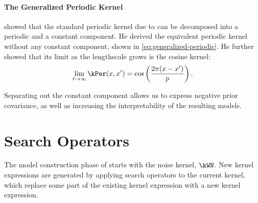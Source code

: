 \subsubsection{The Generalized Periodic Kernel}

\citet{lloyd-periodic} showed that the standard periodic kernel due to \citet{mackay1998introduction} can be decomposed into a periodic and a constant component.
He derived the equivalent periodic kernel without any constant component, shown in \cref{eq:generalized-periodic}.
He further showed that its limit as the lengthscale grows is the cosine kernel:
\begin{equation}
\lim_{\ell \to \infty} \kPer(x, x') = \cos\left(\frac{2 \pi (x - x')}{p}\right).
\end{equation}

Separating out the constant component allows us to express negative prior covariance, as well as increasing the interpretability of the resulting models.






\chapter{Search Operators}
\label{ch:appendix-search}
\label{sec:search-operators}


The model construction phase of \procedurename{} starts with the noise kernel, $\kWN$.
New kernel expressions are generated by applying search operators to the current kernel, which replace some part of the existing kernel expression with a new kernel expression.




